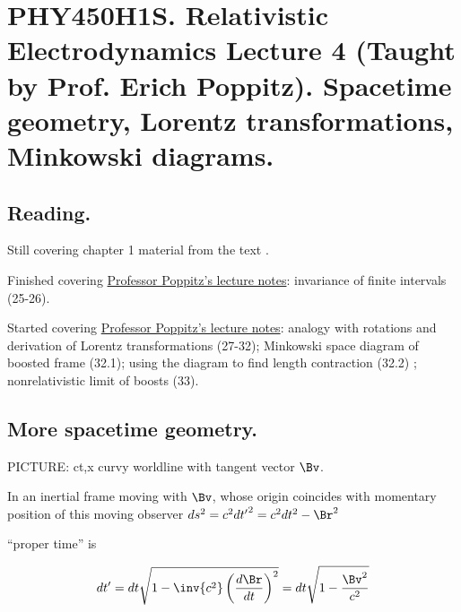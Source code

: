 
%

\chapter{PHY450H1S.  Relativistic Electrodynamics Lecture 4 (Taught by Prof. Erich Poppitz).  Spacetime geometry, Lorentz transformations, Minkowski diagrams.}
\label{chap:relativisticElectrodynamicsL4}
{}
\date{Jan 18, 2011}

\beginArtNoToc

\section{Reading.}

Still covering chapter 1 material from the text \cite{landau1980classical}.

Finished covering \href{http://www.physics.utoronto.ca/~poppitz/e-poppitz/PHY450_files/RelEM12-26.pdf}{Professor Poppitz's lecture notes}: invariance of finite intervals (25-26).

Started covering \href{http://www.physics.utoronto.ca/~poppitz/e-poppitz/PHY450_files/RelEM27-44.pdf}{Professor Poppitz's lecture notes}: analogy with rotations and derivation of Lorentz transformations (27-32); Minkowski space diagram of boosted frame (32.1); using the diagram to find length contraction (32.2) ; nonrelativistic limit of boosts (33).

\section{More spacetime geometry.}

PICTURE: ct,x curvy worldline with tangent vector $\Bv$.

In an inertial frame moving with $\Bv$, whose origin coincides with momentary position of this moving observer $ds^2 = c^2 {dt'}^2 = c^2 dt^2 - \Br^2$

``proper time'' is

\begin{equation}\label{eqn:relativisticElectrodynamicsL4:10}
dt' = dt \sqrt{ 1 - \inv{c^2} \left( \frac{d\Br}{dt} \right)^2 } = dt \sqrt{ 1 - \frac{\Bv^2}{c^2}} 
\end{equation}

